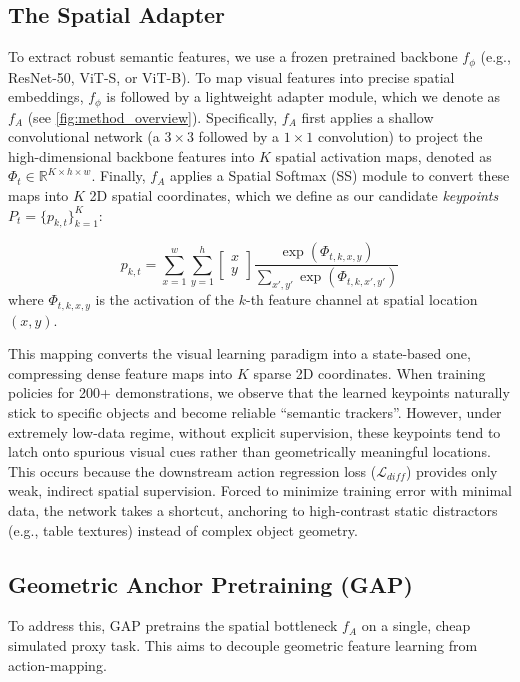 \subsection{The Spatial Adapter}
\label{subsec:arch}
To extract robust semantic features, we use a frozen pretrained backbone $f_\phi$ (e.g., ResNet-50, ViT-S, or ViT-B). To map visual features into precise spatial embeddings, $f_\phi$ is followed by a lightweight adapter module, which we denote as $f_A$ (see \autoref{fig:method_overview}). Specifically, $f_A$ first applies a shallow convolutional network (a $3\times3$ followed by a $1\times1$ convolution) to project the high-dimensional backbone features into $K$ spatial activation maps, denoted as $\Phi_t \in \mathbb{R}^{K \times h \times w}$. Finally, $f_A$ applies a Spatial Softmax (SS) \cite{finn2016deep} module to convert these maps into $K$ 2D spatial coordinates, which we define as our candidate \emph{keypoints} $P_t = \{p_{k,t}\}_{k=1}^K$:

\begin{equation}
    p_{k,t} = \sum_{x=1}^{w} \sum_{y=1}^{h} \begin{bmatrix} x \\ y \end{bmatrix} \frac{\exp(\Phi_{t, k, x, y})}{\sum_{x',y'} \exp(\Phi_{t, k, x', y'})}
\end{equation}
where $\Phi_{t, k, x, y}$ is the activation of the $k$-th feature channel at spatial location $(x,y)$. 

This mapping converts the visual learning paradigm into a state-based one, compressing dense feature maps into $K$ sparse 2D coordinates. When training policies for 200+ demonstrations, we observe that the learned keypoints naturally stick to specific objects and become reliable ``semantic trackers''. However, under extremely low-data regime, without explicit supervision, these keypoints tend to latch onto spurious visual cues rather than geometrically meaningful locations. %
This occurs because the downstream action regression loss ($\mathcal{L}_{diff}$) provides only weak, indirect spatial supervision. Forced to minimize training error with minimal data, the network takes a shortcut, anchoring to high-contrast static distractors (e.g., table textures) instead of complex object geometry.

\subsection{Geometric Anchor Pretraining (GAP)}
\label{subsec:gap_method}
To address this, GAP pretrains the spatial bottleneck $f_A$ on a single, cheap simulated proxy task. This aims to decouple geometric feature learning from action-mapping.

